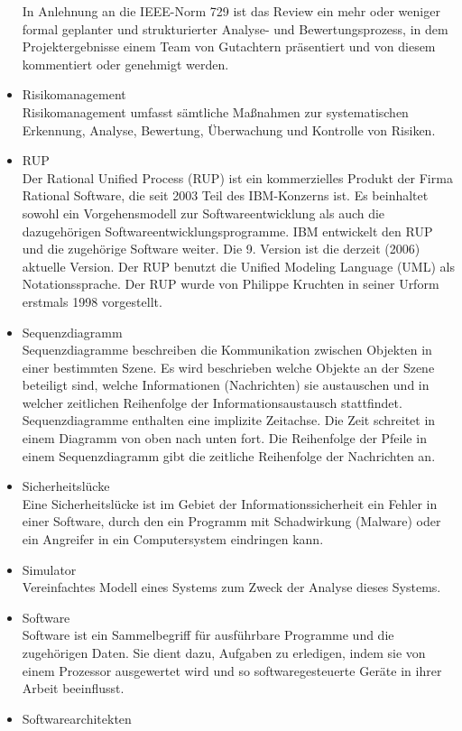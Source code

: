 \begin{itemize}
In Anlehnung an die IEEE-Norm 729 ist das Review ein mehr oder weniger formal geplanter und strukturierter Analyse- und Bewertungsprozess, in dem Projektergebnisse einem Team von Gutachtern präsentiert und von diesem kommentiert oder genehmigt werden.
\item 	Risikomanagement\\
Risikomanagement umfasst sämtliche Maßnahmen zur systematischen Erkennung, Analyse, Bewertung, Überwachung und Kontrolle von Risiken.
\item 	RUP\\Der Rational Unified Process (RUP) ist ein kommerzielles Produkt der Firma Rational Software, die seit 2003 Teil des IBM-Konzerns ist. Es beinhaltet sowohl ein Vorgehensmodell zur Softwareentwicklung als auch die dazugehörigen Softwareentwicklungsprogramme. IBM entwickelt den RUP und die zugehörige Software weiter. Die 9. Version ist die derzeit (2006) aktuelle Version. Der RUP benutzt die Unified Modeling Language (UML) als Notationssprache. Der RUP wurde von Philippe Kruchten in seiner Urform erstmals 1998 vorgestellt.
\item 	Sequenzdiagramm\\
Sequenzdiagramme beschreiben die Kommunikation zwischen Objekten in einer bestimmten Szene. Es wird beschrieben welche Objekte an der Szene beteiligt sind, welche Informationen (Nachrich­ten) sie austauschen und in welcher zeitlichen Reihenfolge der Informationsaustausch stattfindet. Sequenzdiagramme enthalten eine implizite Zeitachse. Die Zeit schreitet in einem Diagramm von oben nach unten fort. Die Reihenfolge der Pfeile in einem Sequenz­diagramm gibt die zeitliche Reihenfolge der Nachrichten an.
\item 	Sicherheitslücke\\Eine Sicherheitslücke ist im Gebiet der Informationssicherheit ein Fehler in einer Software, durch den ein Programm mit Schadwirkung (Malware) oder ein Angreifer in ein Computersystem eindringen kann.
\item 	Simulator\\Vereinfachtes Modell eines Systems zum Zweck der Analyse dieses Systems.
\item 	Software\\
Software ist ein Sammelbegriff für ausführbare Programme und die zugehörigen Daten. Sie dient dazu, Aufgaben zu erledigen, indem sie von einem Prozessor ausgewertet wird und so softwaregesteuerte Geräte in ihrer Arbeit beeinflusst.
\item 	Softwarearchitekten \\

\end{itemize}
